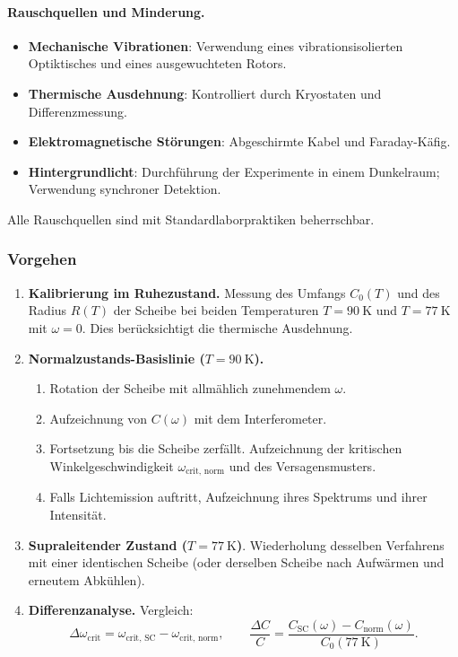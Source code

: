 \documentclass[12pt,a4paper]{article}
\begin{document}
	\paragraph{Rauschquellen und Minderung.}
	\begin{itemize}
		\item \textbf{Mechanische Vibrationen}: Verwendung eines vibrationsisolierten Optiktisches und eines ausgewuchteten Rotors.
		\item \textbf{Thermische Ausdehnung}: Kontrolliert durch Kryostaten und Differenzmessung.
		\item \textbf{Elektromagnetische Störungen}: Abgeschirmte Kabel und Faraday-Käfig.
		\item \textbf{Hintergrundlicht}: Durchführung der Experimente in einem Dunkelraum; Verwendung synchroner Detektion.
	\end{itemize}
	Alle Rauschquellen sind mit Standardlaborpraktiken beherrschbar.
	
	\subsubsection{Vorgehen}
	
	\begin{enumerate}
		\item \textbf{Kalibrierung im Ruhezustand.} Messung des Umfangs \(C_0(T)\) und des Radius \(R(T)\) der Scheibe bei beiden Temperaturen \(T = 90\ \text{K}\) und \(T = 77\ \text{K}\) mit \(\omega = 0\). Dies berücksichtigt die thermische Ausdehnung.
		
		\item \textbf{Normalzustands-Basislinie (\(T = 90\ \text{K}\)).} 
		\begin{enumerate}
			\item Rotation der Scheibe mit allmählich zunehmendem \(\omega\).
			\item Aufzeichnung von \(C(\omega)\) mit dem Interferometer.
			\item Fortsetzung bis die Scheibe zerfällt. Aufzeichnung der kritischen Winkelgeschwindigkeit \(\omega_{\text{crit, norm}}\) und des Versagensmusters.
			\item Falls Lichtemission auftritt, Aufzeichnung ihres Spektrums und ihrer Intensität.
		\end{enumerate}
		
		\item \textbf{Supraleitender Zustand (\(T = 77\ \text{K}\))}. Wiederholung desselben Verfahrens mit einer identischen Scheibe (oder derselben Scheibe nach Aufwärmen und erneutem Abkühlen).
		
		\item \textbf{Differenzanalyse.} Vergleich:
		\[
		\Delta \omega_{\text{crit}} = \omega_{\text{crit, SC}} - \omega_{\text{crit, norm}},\qquad
		\frac{\Delta C}{C} = \frac{C_{\text{SC}}(\omega) - C_{\text{norm}}(\omega)}{C_0(77\ \text{K})}.
		\]
	\end{enumerate}
	
\end{document}
